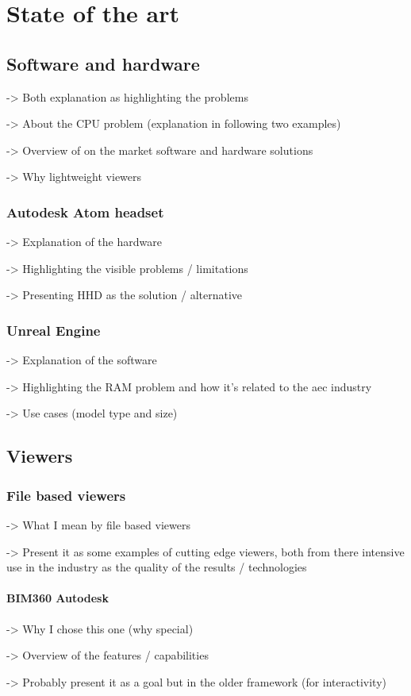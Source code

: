 \chapter{State of the art}
\section{Software and hardware}
-> Both explanation as highlighting the problems

-> About the CPU problem (explanation in following two examples)

-> Overview of on the market software and hardware solutions

-> Why lightweight viewers

\subsection{Autodesk Atom headset}
-> Explanation of the hardware

-> Highlighting the visible problems / limitations

-> Presenting HHD as the solution / alternative

\subsection{Unreal Engine}
-> Explanation of the software

-> Highlighting the RAM problem and how it's related to the aec industry

-> Use cases (model type and size)

\section{Viewers}
\subsection{File based viewers}
-> What I mean by file based viewers

-> Present it as some examples of cutting edge viewers, both from there intensive use in the industry as the quality of the results / technologies
\subsubsection{BIM360 Autodesk}
-> Why I chose this one (why special)

-> Overview of the features / capabilities

-> Probably present it as a goal but in the older framework (for interactivity)
